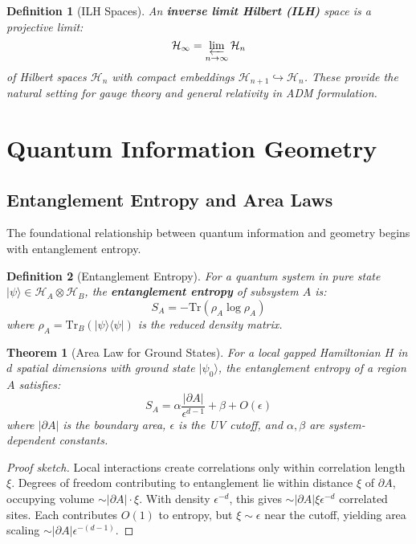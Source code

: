 \documentclass[11pt,a4paper]{article}
\newtheorem{theorem}{Theorem}[section]
\newtheorem{definition}{Definition}[section]
\theoremstyle{remark}
\theoremstyle{definition}
\begin{document}
\begin{definition}[ILH Spaces]
An \textbf{inverse limit Hilbert (ILH)} space is a projective limit:
\begin{equation}
\mathcal{H}_\infty = \varprojlim_{n \to \infty} \mathcal{H}_n
\end{equation}
of Hilbert spaces $\mathcal{H}_n$ with compact embeddings $\mathcal{H}_{n+1} \hookrightarrow \mathcal{H}_n$. These provide the natural setting for gauge theory and general relativity in ADM formulation.
\end{definition}

\section{Quantum Information Geometry}
\label{sec:quantum_information_geometry}

\subsection{Entanglement Entropy and Area Laws}

The foundational relationship between quantum information and geometry begins with entanglement entropy.

\begin{definition}[Entanglement Entropy]
For a quantum system in pure state $|\psi\rangle \in \mathcal{H}_A \otimes \mathcal{H}_B$, the \textbf{entanglement entropy} of subsystem $A$ is:
\begin{equation}
S_A = -\text{Tr}(\rho_A \log \rho_A)
\end{equation}
where $\rho_A = \text{Tr}_B(|\psi\rangle\langle\psi|)$ is the reduced density matrix.
\end{definition}

\begin{theorem}[Area Law for Ground States]
\label{thm:area_law}
For a local gapped Hamiltonian $H$ in $d$ spatial dimensions with ground state $|\psi_0\rangle$, the entanglement entropy of a region $A$ satisfies:
\begin{equation}
S_A = \alpha \frac{|\partial A|}{\epsilon^{d-1}} + \beta + O(\epsilon)
\end{equation}
where $|\partial A|$ is the boundary area, $\epsilon$ is the UV cutoff, and $\alpha, \beta$ are system-dependent constants.
\end{theorem}

\begin{proof}[Proof sketch]
Local interactions create correlations only within correlation length $\xi$. Degrees of freedom contributing to entanglement lie within distance $\xi$ of $\partial A$, occupying volume $\sim |\partial A| \cdot \xi$. With density $\epsilon^{-d}$, this gives $\sim |\partial A| \xi \epsilon^{-d}$ correlated sites. Each contributes $O(1)$ to entropy, but $\xi \sim \epsilon$ near the cutoff, yielding area scaling $\sim |\partial A| \epsilon^{-(d-1)}$.
\end{proof}
\end{document}
